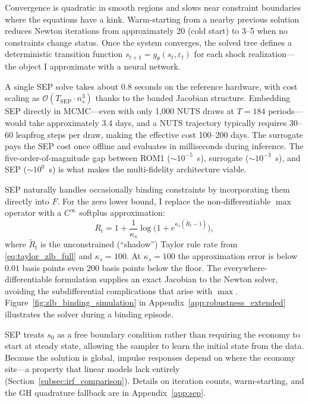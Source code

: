 \documentclass[12pt]{article}
\theoremstyle{plain}
\theoremstyle{definition}
\theoremstyle{remark}
\newcommand{\eps}{\varepsilon}
\begin{document}
Convergence is quadratic in smooth regions and slows near constraint boundaries where the equations have a kink. Warm-starting from a nearby previous solution reduces Newton iterations from approximately 20 (cold start) to 3--5 when no constraints change status. Once the system converges, the solved tree defines a deterministic transition function $s_{t+1} = g_\theta(s_t, \eps_t)$ for each shock realization---the object I approximate with a neural network.

A single SEP solve takes about 0.8 seconds on the reference hardware, with cost scaling as $\mathcal{O}(T_{\text{SEP}} \cdot n_s^3)$ thanks to the banded Jacobian structure. Embedding SEP directly in MCMC---even with only 1,000 NUTS draws at $T=184$ periods---would take approximately 3.4 days, and a NUTS trajectory typically requires 30--60 leapfrog steps per draw, making the effective cost 100--200 days. The surrogate pays the SEP cost once offline and evaluates in milliseconds during inference. The five-order-of-magnitude gap between ROM1 ($\sim10^{-5}$~s), surrogate ($\sim10^{-3}$~s), and SEP ($\sim10^{0}$~s) is what makes the multi-fidelity architecture viable.

SEP naturally handles occasionally binding constraints by incorporating them directly into $F$. For the zero lower bound, I replace the non-differentiable $\max$ operator with a $C^\infty$ softplus approximation:
\begin{equation}
R_t = 1 + \frac{1}{\kappa_s}\log\!\bigl(1 + e^{\kappa_s(\tilde{R}_t - 1)}\bigr), \label{eq:softplus_zlb}
\end{equation}
where $\tilde{R}_t$ is the unconstrained (``shadow'') Taylor rule rate from \eqref{eq:taylor_zlb_full} and $\kappa_s = 100$. At $\kappa_s = 100$ the approximation error is below $0.01$ basis points even 200 basis points below the floor. The everywhere-differentiable formulation supplies an exact Jacobian to the Newton solver, avoiding the subdifferential complications that arise with $\max$. Figure~\ref{fig:zlb_binding_simulation} in Appendix~\ref{app:robustness_extended} illustrates the solver during a binding episode.

SEP treats $s_0$ as a free boundary condition rather than requiring the economy to start at steady state, allowing the sampler to learn the initial state from the data. Because the solution is global, impulse responses depend on where the economy sits---a property that linear models lack entirely (Section~\ref{subsec:irf_comparison}). Details on iteration counts, warm-starting, and the GH quadrature fallback are in Appendix~\ref{app:sep}.
\end{document}
